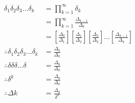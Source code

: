 \documentclass[a4paper]{article}
\begin{document}
\begin{enumerate}[label=\textbf{\arabic*.}]
\begin{enumerate}
		\begin{align*}
		\delta_1 \delta_2 \delta_3 \dots \delta_k & = \prod_{k=1}^{\infty}\delta_k\\
		& = \prod_{k=1}^{\infty}\frac{\Delta_{k-1}}{\Delta_{k}}\\
		& = \left[\frac{\Delta_0}{\Delta_{1}}\right] \left[\frac{\Delta_1}{\Delta_{2}}\right] \left[\frac{\Delta_2}{\Delta_{3}}\right] {\dots} \left[\frac{\Delta_{k-1}}{\Delta_{k}}\right]\\
		\therefore \delta_1 \delta_2 \delta_3 \dots \delta_k & = \frac{\Delta_0}{\Delta_{k}}\\
		\therefore \delta \delta \delta \dots \delta & = \frac{\Delta_0}{\Delta_{k}}\\
		\therefore \delta^{k} & = \frac{\Delta_0}{\Delta_{k}}\\
		\therefore \Delta{k} & = \frac{\Delta_0}{\delta^{k}}\\
		\end{align*}


\end{enumerate}
\end{enumerate}
\end{document}
